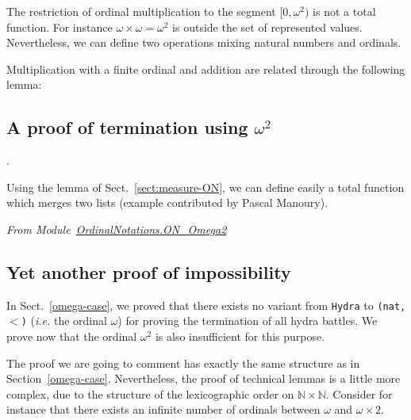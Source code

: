 The restriction of ordinal multiplication to the segment $[0,\omega^2)$ is not a total function.
For instance $\omega\times\omega= \omega^2$ is outside the set of represented values.
Nevertheless, we can define two operations mixing natural numbers and ordinals.



\vspace{4pt}



Multiplication with a finite ordinal and addition are related through the following lemma:

 



\subsection{A proof of termination using \texorpdfstring{$\omega^2$}{omega^2}} 
\label{sect:merge-example}.

Using the lemma of Sect.~\vref{sect:measure-ON}, we can define easily a total function which merges two lists (example contributed by Pascal Manoury).


\vspace{4pt}
\noindent\emph{From Module~\href{../theories/html/hydras.OrdinalNotations.ON_Omega2.html}{OrdinalNotations.ON\_Omega2}}



 

\subsection{Yet another  proof of impossibility}
\label{omega2-case}

In Sect.~\vref{omega-case}, we proved that there exists no variant from \texttt{Hydra} to \texttt{(nat,$<$)}
(\emph{i.e.} the ordinal $\omega$) for proving the termination of all hydra battles.
We  prove now that  the ordinal $\omega^2$ is also insufficient for this purpose. 

The proof we are going to comment has exactly the same structure as in Section~\ref{omega-case}.
 Nevertheless, the proof of technical  lemmas is a little more complex, due to 
 the structure of the lexicographic order on $\mathbb{N}\times\mathbb{N}$. 
Consider for instance that there exists an infinite number of ordinals  between
$\omega$ and $\omega\times 2$.



